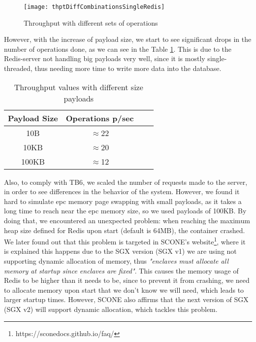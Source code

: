\begin{figure}[htbp]
	\centering
	{\texttt{[image: thptDiffCombinationsSingleRedis]}}
	\caption{Throughput with different sets of operations}
	\label{fig:thptDiffCombinationsSingleRedis}
\end{figure}

However, with the increase of payload size, we start to see significant drops in the number of operations done, as we can see in the Table \ref{table:throughputPayloads}. This is due to the Redis-server not handling big payloads very well, since it is mostly single-threaded, thus needing more time to write more data into the database.

\begin{table}[ht]
	\caption{Throughput values with different size payloads} %
	\centering %
	\begin{tabular}{c c c c} %
		\hline\hline %
		\textbf{Payload Size} & \textbf{Operations p/sec}\\ [0.5ex] %
		\hline
		10B &  $\approx$22\\
		\hline
		10KB &  $\approx$20\\
		\hline %
		100KB &  $\approx$12\\ [1ex] %
		\hline %
	\end{tabular}
	\label{table:throughputPayloads} %
\end{table} 

Also, to comply with TB6, we scaled the number of requests made to the server, in order to see differences in the behavior of the system. However, we found it hard to simulate \gls{epc} memory page swapping with small payloads, as it takes a long time to reach near the \gls{epc} memory size, so we used payloads of 100KB. By doing that, we encountered an unexpected problem: when reaching the maximum heap size defined for Redis upon start (default is 64MB), the container crashed. We later found out that this problem is targeted in SCONE's website\footnote{https://sconedocs.github.io/faq/}, where it is explained this happens due to the SGX version (SGX v1) we are using not supporting dynamic allocation of memory, thus \textit{"enclaves must allocate all memory at startup since enclaves are fixed"}. This causes the memory usage of Redis to be higher than it needs to be, since to prevent it from crashing, we need to allocate memory upon start that we don't know we will need, which leads to larger startup times. However, SCONE also affirms that the next version of SGX (SGX v2) will support dynamic allocation, which tackles this problem. 

